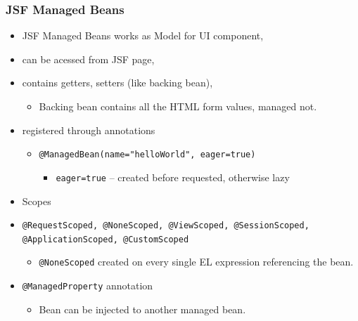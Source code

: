 \documentclass[10pt,xcolor=pdflatex]{beamer}
\begin{document}
\begin{frame}\frametitle{JSF Managed Beans}
	\begin{itemize}
		\item JSF Managed Beans works as Model for UI component,
        \item can be acessed from JSF page,
        \item contains getters, setters (like backing bean),
          \begin{itemize}
            \item {\footnotesize Backing bean contains all the HTML form values, managed not.}
          \end{itemize}
        \item registered through annotations
          \begin{itemize}
            \item {\footnotesize \texttt{@ManagedBean(name="helloWorld", eager=true)}}
              \begin{itemize}
                \item {\footnotesize \texttt{eager=true} -- created before requested, otherwise lazy}
              \end{itemize}
          \end{itemize}
        \item Scopes
        \item[] \texttt{@RequestScoped, @NoneScoped, @ViewScoped, @SessionScoped, @ApplicationScoped, @CustomScoped}
          \begin{itemize}
              \item \texttt{@NoneScoped} created on every single EL expression referencing the bean.
          \end{itemize}
        \item \texttt{@ManagedProperty} annotation
        \begin{itemize}
            \item {\footnotesize Bean can be injected to another managed bean.}
        \end{itemize}
	\end{itemize}
\end{frame}
\end{document}
